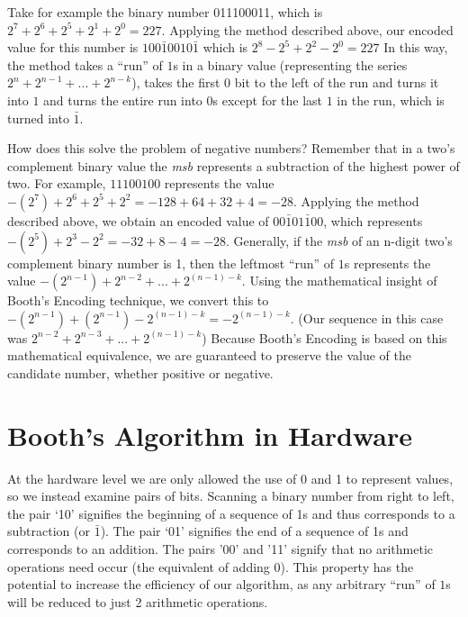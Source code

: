 \documentclass{article}
\begin{document}
Take for example the binary number 011100011, which is $2^7 + 2^6 + 2^5 + 2^1 + 2^0 = 227$.
Applying the method described above, our encoded value for this number is $100\bar{1}0010\bar{1}$ which is $2^8 - 2^5 + 2^2 - 2^0 = 227$
In this way, the method takes a ``run'' of $1$s in a binary value (representing the series $2^{n} + 2^{n-1} + ...
+ 2^{n-k}$), takes the first 0 bit to the left of the run and turns it into $1$ and turns the entire run into $0$s except for the last $1$ in the run, which is turned into $\bar{1}$.

How does this solve the problem of negative numbers?
Remember that in a two's complement binary value the \emph{msb} represents a subtraction of the highest power of two.
For example, $11100100$ represents the value $-(2^{7}) + 2^{6} + 2^{5} + 2^{2} = -128 + 64 + 32 + 4 = -28$.
Applying the method described above, we obtain an encoded value of $00\bar{1}01\bar{1}00$, which represents $-(2^{5}) + 2^{3} - 2^{2} = -32 + 8 - 4 = -28$.
Generally, if the \emph{msb} of an n-digit two's complement binary number is 1, then the leftmost ``run'' of $1$s represents the value $-(2^{n-1}) + 2^{n-2} + ...
+ 2^{(n-1)-k}$.
Using the mathematical insight of Booth's Encoding technique, we convert this to $-(2^{n-1}) + (2^{n-1}) - 2^{(n-1)-k} = -2^{(n-1)-k}$.
(Our sequence in this case was $2^{n-2} + 2^{n-3} + ...
+ 2^{(n-1)-k}$)
Because Booth's Encoding is based on this mathematical equivalence, we are guaranteed to preserve the value of the candidate number, whether positive or negative.
 

\section{Booth's Algorithm in Hardware}
    At the hardware level we are only allowed the use of 0 and 1 to represent values, so we instead examine pairs of bits.
Scanning a binary number from right to left, the pair `10' signifies the beginning of a sequence of 1s and thus corresponds to a subtraction (or $\bar{1}$).
The pair `01' signifies the end of a sequence of 1s and corresponds to an addition.
The pairs '00' and '11' signify that no arithmetic operations need occur (the equivalent of adding 0).
This property has the potential to increase the efficiency of our algorithm, as any arbitrary ``run'' of $1$s will be reduced to just 2 arithmetic operations.
\end{document}
